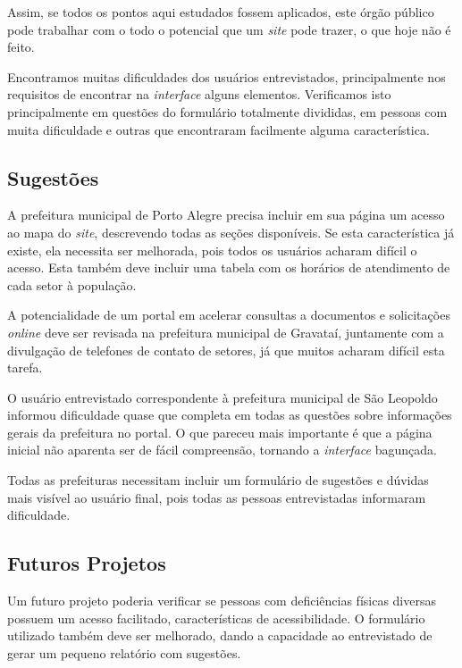 \documentclass{article}
\begin{document}
Assim, se todos os pontos aqui estudados fossem aplicados, este órgão público
pode trabalhar com o todo o potencial que um \textit{site} pode trazer, o que
hoje não é feito.

Encontramos muitas dificuldades dos usuários entrevistados, principalmente nos
requisitos de encontrar na \textit{interface} alguns elementos. Verificamos isto
principalmente em questões do formulário totalmente divididas, em pessoas com
muita dificuldade e outras que encontraram facilmente alguma característica.

\subsection{Sugestões}

A prefeitura municipal de Porto Alegre precisa incluir em sua página um acesso
ao mapa do \textit{site}, descrevendo todas as seções disponíveis. Se esta
característica já existe, ela necessita ser melhorada, pois todos os usuários
acharam difícil o acesso. Esta também deve incluir uma tabela com os horários de
atendimento de cada setor à população.

A potencialidade de um portal em acelerar consultas a documentos e solicitações
\textit{online} deve ser revisada na prefeitura municipal de Gravataí,
juntamente com a divulgação de telefones de contato de setores, já que muitos
acharam difícil esta tarefa.

O usuário entrevistado correspondente à prefeitura municipal de São Leopoldo
informou dificuldade quase que completa em todas as questões sobre informações
gerais da prefeitura no portal. O que pareceu mais importante é que a página
inicial não aparenta ser de fácil compreensão, tornando a \textit{interface}
bagunçada.

Todas as prefeituras necessitam incluir um formulário de sugestões e dúvidas
mais visível ao usuário final, pois todas as pessoas entrevistadas informaram
dificuldade.

\subsection{Futuros Projetos}

Um futuro projeto poderia verificar se pessoas com deficiências físicas diversas
possuem um acesso facilitado, características de acessibilidade. O formulário
utilizado também deve ser melhorado, dando a capacidade ao entrevistado de gerar
um pequeno relatório com sugestões.



\end{document}
